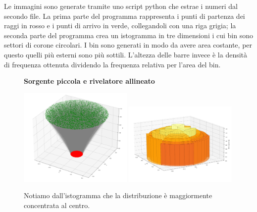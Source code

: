         Le immagini sono generate tramite uno script python che estrae i numeri dal secondo file. La prima parte del programma rappresenta i punti di partenza dei raggi in rosso e i punti di arrivo in verde, collegandoli con una riga grigia; la seconda parte del programma crea un istogramma in tre dimensioni i cui bin sono settori di corone circolari. I bin sono generati in modo da avere area costante, per questo quelli più esterni sono più sottili. L'altezza delle barre invece è la densità di frequenza ottenuta dividendo la frequenza relativa per l'area del bin.

        \begin{figure}[ht]
            \textbf{Sorgente piccola e rivelatore allineato}
            
            \centering
            \includegraphics[width=0.49\textwidth]{images/accettanza/example1.1.png}
            \includegraphics[width=0.49\textwidth]{images/accettanza/example1.2.png}
            \caption{Notiamo dall'istogramma che la distribuzione è maggiormente concentrata al centro.}
        \end{figure}

